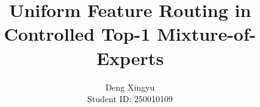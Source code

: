 \documentclass[10pt,twocolumn,letterpaper]{article}
\title{Uniform Feature Routing in Controlled Top-1 Mixture-of-Experts}
\author{Deng Xingyu\\
Student ID: 250010109}
\begin{document}
\maketitle








{
    \small
    
    
}
\end{document}
